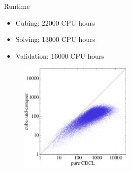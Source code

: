 \documentclass[c,8pt,xcolor...,x11names,usenames,dvipsnames]{beamer}
\begin{document}
\begin{frame}{Runtime}
\begin{itemize}
	\item Cubing: 22000 CPU hours
	\item Solving: 13000 CPU hours
	\item Validation: 16000 CPU hours 
\end{itemize}
\pause
\begin{figure}
	\includegraphics[width=0.5\textwidth]{images/plot1.png} 
\end{figure}
\end{frame}
\end{document}
